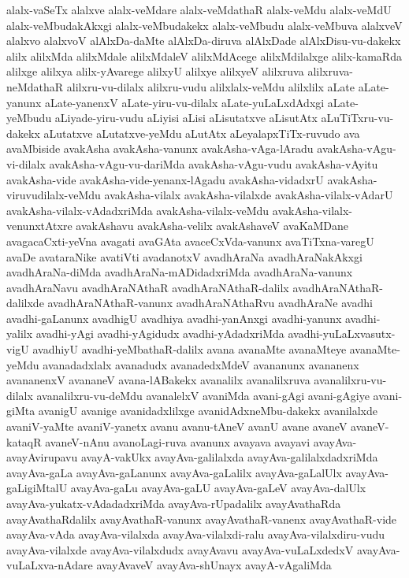 {alalx-vaSeTx
alalxve
alalx-veMdare
alalx-veMdathaR
alalx-veMdu
alalx-veMdU
alalx-veMbudakAkxgi
alalx-veMbudakekx
alalx-veMbudu
alalx-veMbuva
alalxveV
alalxvo
alalxvoV
alAlxDa-daMte
alAlxDa-diruva
alAlxDade
alAlxDisu-vu-dakekx
alilx
alilxMda
alilxMdale
alilxMdaleV
alilxMdAcege
alilxMdilalxge
alilx-kamaRda
alilxge
alilxya
alilx-yAvarege
alilxyU
alilxye
alilxyeV
alilxruva
alilxruva-neMdathaR
alilxru-vu-dilalx
alilxru-vudu
alilxlalx-veMdu
alilxlilx
aLate
aLate-yanunx
aLate-yanenxV
aLate-yiru-vu-dilalx
aLate-yuLaLxdAdxgi
aLate-yeMbudu
aLiyade-yiru-vudu
aLiyisi
aLisi
aLisutatxve
aLisutAtx
aLuTiTxru-vu-dakekx
aLutatxve
aLutatxve-yeMdu
aLutAtx
aLeyalapxTiTx-ruvudo
ava
avaMbiside
avakAsha
avakAsha-vanunx
avakAsha-vAga-lAradu
avakAsha-vAgu-vi-dilalx
avakAsha-vAgu-vu-dariMda
avakAsha-vAgu-vudu
avakAsha-vAyitu
avakAsha-vide
avakAsha-vide-yenanx-lAgadu
avakAsha-vidadxrU
avakAsha-viruvudilalx-veMdu
avakAsha-vilalx
avakAsha-vilalxde
avakAsha-vilalx-vAdarU
avakAsha-vilalx-vAdadxriMda
avakAsha-vilalx-veMdu
avakAsha-vilalx-venunxtAtxre
avakAshavu
avakAsha-velilx
avakAshaveV
avaKaMDane
avagacaCxti-yeVna
avagati
avaGAta
avaceCxVda-vanunx
avaTiTxna-varegU
avaDe
avataraNike
avatiVti
avadanotxV
avadhAraNa
avadhAraNakAkxgi
avadhAraNa-diMda
avadhAraNa-mADidadxriMda
avadhAraNa-vanunx
avadhAraNavu
avadhAraNAthaR
avadhAraNAthaR-dalilx
avadhAraNAthaR-dalilxde
avadhAraNAthaR-vanunx
avadhAraNAthaRvu
avadhAraNe
avadhi
avadhi-gaLanunx
avadhigU
avadhiya
avadhi-yanAnxgi
avadhi-yanunx
avadhi-yalilx
avadhi-yAgi
avadhi-yAgidudx
avadhi-yAdadxriMda
avadhi-yuLaLxvasutx-vigU
avadhiyU
avadhi-yeMbathaR-dalilx
avana
avanaMte
avanaMteye
avanaMte-yeMdu
avanadadxlalx
avanadudx
avanadedxMdeV
avananunx
avananenx
avananenxV
avananeV
avana-lABakekx
avanalilx
avanalilxruva
avanalilxru-vu-dilalx
avanalilxru-vu-deMdu
avanalelxV
avaniMda
avani-gAgi
avani-gAgiye
avani-giMta
avanigU
avanige
avanidadxlilxge
avanidAdxneMbu-dakekx
avanilalxde
avaniV-yaMte
avaniV-yanetx
avanu
avanu-tAneV
avanU
avane
avaneV
avaneV-kataqR
avaneV-nAnu
avanoLagi-ruva
avanunx
avayava
avayavi
avayAva-avayAvirupavu
avayA-vakUkx
avayAva-galilalxda
avayAva-galilalxdadxriMda
avayAva-gaLa
avayAva-gaLanunx
avayAva-gaLalilx
avayAva-gaLalUlx
avayAva-gaLigiMtalU
avayAva-gaLu
avayAva-gaLU
avayAva-gaLeV
avayAva-dalUlx
avayAva-yukatx-vAdadadxriMda
avayAva-rUpadalilx
avayAvathaRda
avayAvathaRdalilx
avayAvathaR-vanunx
avayAvathaR-vanenx
avayAvathaR-vide
avayAva-vAda
avayAva-vilalxda
avayAva-vilalxdi-ralu
avayAva-vilalxdiru-vudu
avayAva-vilalxde
avayAva-vilalxdudx
avayAvavu
avayAva-vuLaLxdedxV
avayAva-vuLaLxva-nAdare
avayAvaveV
avayAva-shUnayx
avayA-vAgaliMda
}
